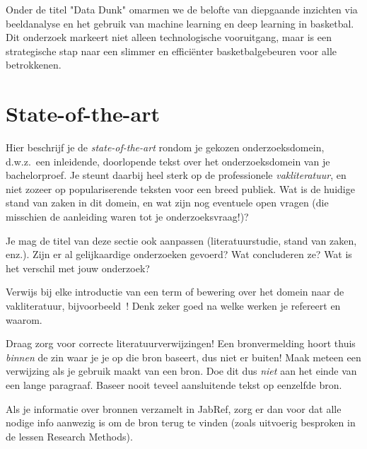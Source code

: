 Onder de titel "Data Dunk" omarmen we de belofte van diepgaande inzichten via beeldanalyse en het gebruik van machine learning en deep learning in basketbal. Dit onderzoek markeert niet alleen technologische vooruitgang, maar is een strategische stap naar een slimmer en efficiënter basketbalgebeuren voor alle betrokkenen.



\section{State-of-the-art}%
\label{sec:state-of-the-art}

Hier beschrijf je de \emph{state-of-the-art} rondom je gekozen onderzoeksdomein, d.w.z.\ een inleidende, doorlopende tekst over het onderzoeksdomein van je bachelorproef. Je steunt daarbij heel sterk op de professionele \emph{vakliteratuur}, en niet zozeer op populariserende teksten voor een breed publiek. Wat is de huidige stand van zaken in dit domein, en wat zijn nog eventuele open vragen (die misschien de aanleiding waren tot je onderzoeksvraag!)?

Je mag de titel van deze sectie ook aanpassen (literatuurstudie, stand van zaken, enz.). Zijn er al gelijkaardige onderzoeken gevoerd? Wat concluderen ze? Wat is het verschil met jouw onderzoek?

Verwijs bij elke introductie van een term of bewering over het domein naar de vakliteratuur, bijvoorbeeld~\autocite{Hykes2013}! Denk zeker goed na welke werken je refereert en waarom.

Draag zorg voor correcte literatuurverwijzingen! Een bronvermelding hoort thuis \emph{binnen} de zin waar je je op die bron baseert, dus niet er buiten! Maak meteen een verwijzing als je gebruik maakt van een bron. Doe dit dus \emph{niet} aan het einde van een lange paragraaf. Baseer nooit teveel aansluitende tekst op eenzelfde bron.

Als je informatie over bronnen verzamelt in JabRef, zorg er dan voor dat alle nodige info aanwezig is om de bron terug te vinden (zoals uitvoerig besproken in de lessen Research Methods).


